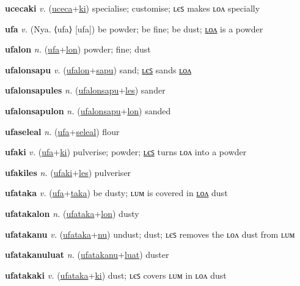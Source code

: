 \textbf{\hypertarget{ucecaki}{ucecaki}} \textit{v.} (\hyperlink{uceca}{uceca}+\allowbreak \hyperlink{ki}{ki})
specialise; customise; ʟєꜱ makes ʟᴏᴧ specially

\textbf{\hypertarget{ufa}{ufa}} \textit{v.} (Nya. ⟨ufa⟩ [ufa])
be powder; be fine; be dust; \hyperlink{ufalon}{ʟᴏᴧ} is a powder

\textbf{\hypertarget{ufalon}{ufalon}} \textit{n.} (\hyperlink{ufa}{ufa}+\allowbreak \hyperlink{lon}{lon})
powder; fine; dust

\textbf{\hypertarget{ufalonsapu}{ufalonsapu}} \textit{v.} (\hyperlink{ufalon}{ufalon}+\allowbreak \hyperlink{sapu}{sapu})
sand; \hyperlink{ufalonsapules}{ʟєꜱ} sands \hyperlink{ufalonsapulon}{ʟᴏᴧ}

\textbf{\hypertarget{ufalonsapules}{ufalonsapules}} \textit{n.} (\hyperlink{ufalonsapu}{ufalonsapu}+\allowbreak \hyperlink{les}{les})
sander

\textbf{\hypertarget{ufalonsapulon}{ufalonsapulon}} \textit{n.} (\hyperlink{ufalonsapu}{ufalonsapu}+\allowbreak \hyperlink{lon}{lon})
sanded

\textbf{\hypertarget{ufaseleal}{ufaseleal}} \textit{n.} (\hyperlink{ufa}{ufa}+\allowbreak \hyperlink{seleal}{seleal})
flour

\textbf{\hypertarget{ufaki}{ufaki}} \textit{v.} (\hyperlink{ufa}{ufa}+\allowbreak \hyperlink{ki}{ki})
pulverise; powder; \hyperlink{ufakiles}{ʟєꜱ} turns ʟᴏᴧ into a powder

\textbf{\hypertarget{ufakiles}{ufakiles}} \textit{n.} (\hyperlink{ufaki}{ufaki}+\allowbreak \hyperlink{les}{les})
pulveriser

\textbf{\hypertarget{ufataka}{ufataka}} \textit{v.} (\hyperlink{ufa}{ufa}+\allowbreak \hyperlink{taka}{taka})
be dusty; ʟᴜᴍ is covered in \hyperlink{ufatakalon}{ʟᴏᴧ} dust

\textbf{\hypertarget{ufatakalon}{ufatakalon}} \textit{n.} (\hyperlink{ufataka}{ufataka}+\allowbreak \hyperlink{lon}{lon})
dusty

\textbf{\hypertarget{ufatakanu}{ufatakanu}} \textit{v.} (\hyperlink{ufataka}{ufataka}+\allowbreak \hyperlink{nu}{nu})
undust; dust; ʟєꜱ removes the ʟᴏᴧ dust from ʟᴜᴍ

\textbf{\hypertarget{ufatakanuluat}{ufatakanuluat}} \textit{n.} (\hyperlink{ufatakanu}{ufatakanu}+\allowbreak \hyperlink{luat}{luat})
duster

\textbf{\hypertarget{ufatakaki}{ufatakaki}} \textit{v.} (\hyperlink{ufataka}{ufataka}+\allowbreak \hyperlink{ki}{ki})
dust; ʟєꜱ covers ʟᴜᴍ in ʟᴏᴧ dust

